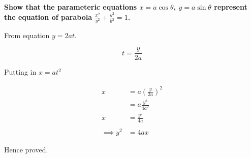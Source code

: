 \documentclass[crop=false,fleqn]{standalone}
\begin{document}
    \textbf{
        Show that the parameteric equations $x=a\cos\theta$, $y=a\sin\theta$
        represent the equation of parabola $\frac{x^2}{y^2}+\frac{y^2}{b^2}=1$.
    }

    From equation $y=2at$.

    $$
    t=\frac{y}{2a}
    $$

    Putting in $x=at^2$

    \begin{align*}
        x &= a\left(\frac{y}{2a}\right)^2 \\
            &= a\frac{y^2}{4a^2} \\
        x &= \frac{y^2}{4a} \\
        \\
        \implies y^2 &= 4ax \tag{By Rearranging}
    \end{align*}

    Hence proved.
\end{document}
